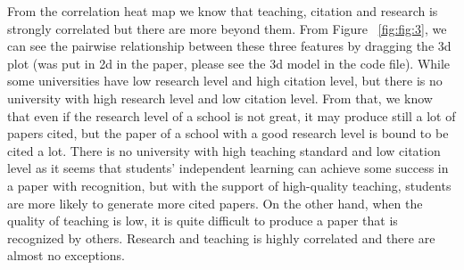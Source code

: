 \documentclass[a4paper]{article}
\begin{document}
\FloatBarrier
From the correlation heat map we know that teaching, citation and research is strongly correlated but there are more beyond them. From Figure ~\ref{fig:fig:3}, we can see the pairwise relationship between these three features by dragging the 3d plot (was put in 2d in the paper, please see the 3d model in the code file). While some universities have low research level and high citation level, but there is no university with high research level and low citation level. From that, we know that even if the research level of a school is not great, it may produce still a lot of papers cited, but the paper of a school with a good research level is bound to be cited a lot. There is no university with high teaching standard and low citation level as it seems that students' independent learning can achieve some success in a paper with recognition, but with the support of high-quality teaching, students are more likely to generate more cited papers. On the other hand, when the quality of teaching is low, it is quite difficult to produce a paper that is recognized by others. Research and teaching is highly correlated and there are almost no exceptions.
\end{document}
